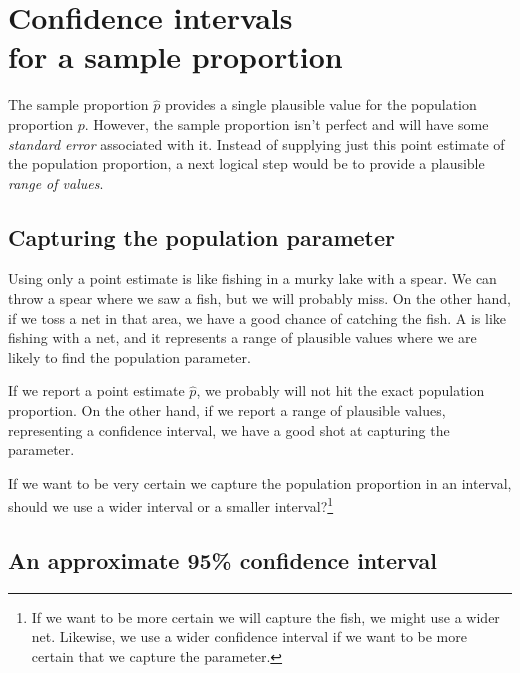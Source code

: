 \section[Confidence intervals for a sample proportion]
    {Confidence intervals\\for a sample proportion}
\label{confidenceIntervals}


The sample proportion $\hat{p}$ provides a single plausible value
for the population proportion $p$. However, the sample proportion
isn't perfect and will have some \emph{standard error}
associated with it. Instead of supplying just this point estimate
of the population proportion, a next logical step would be
to provide a plausible \emph{range of values}.

\subsection{Capturing the population parameter}

Using only a point estimate is like fishing in a murky
lake with a spear. We can throw a spear where we
saw a fish, but we will probably miss. On the other hand,
if we toss a net in that area, we have a good chance of
catching the fish.
A  is like fishing with a net,
and it represents a range of plausible values where we
are likely to find the population parameter.

If we report a point estimate $\hat{p}$, we probably
will not hit the exact population proportion. On the
other hand, if we report a range of plausible values,
representing a confidence interval,
we have a good shot at capturing the parameter.

\begin{exercise}
If we want to be very certain we capture the population
proportion in an interval, should we use a wider interval
or a smaller interval?\footnote{If we want to be more
certain we will capture the fish, we might use a
wider net. Likewise, we use a wider confidence interval
if we want to be more certain that we capture the
parameter.}
\end{exercise}

\subsection{An approximate 95\% confidence interval}

